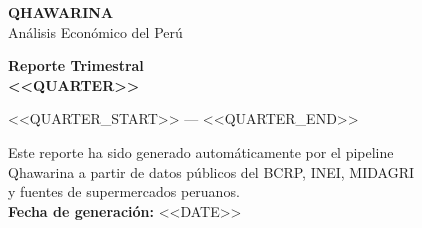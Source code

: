 \documentclass[10pt,a4paper]{article}
\begin{document}
\thispagestyle{empty}
\begin{center}

\vspace*{2cm}

\begin{tcolorbox}[
  enhanced,
  colback=terra,
  colframe=terra,
  boxrule=0pt,
  arc=4pt,
  left=20pt, right=20pt, top=20pt, bottom=20pt,
  width=0.85\textwidth,
  halign=center,
]
  {\fontsize{32}{36}\selectfont\bfseries\color{white}QHAWARINA}\\[6pt]
  {\large\color{white!80!terra}Análisis Económico del Perú}
\end{tcolorbox}

\vspace{1.5cm}

{\fontsize{24}{28}\selectfont\bfseries\color{ink}Reporte Trimestral}\\[0.5em]
{\fontsize{20}{24}\selectfont\color{terra}\textbf{<<QUARTER>>}}

\vspace{0.8em}

{\large\color{ink3}<<QUARTER_START>> — <<QUARTER_END>>}

\vspace{2cm}

\begin{tcolorbox}[
  enhanced,
  colback=white,
  colframe=border,
  boxrule=0.5pt,
  arc=3pt,
  left=15pt, right=15pt, top=10pt, bottom=10pt,
  width=0.75\textwidth,
]
  \centering
  \small\color{ink3}
  Este reporte ha sido generado automáticamente por el pipeline\\
  Qhawarina a partir de datos públicos del BCRP, INEI, MIDAGRI\\
  y fuentes de supermercados peruanos.\\[6pt]
  \textbf{Fecha de generación:} <<DATE>>
\end{tcolorbox}

\vspace{1.5cm}


\end{center}
\end{document}
